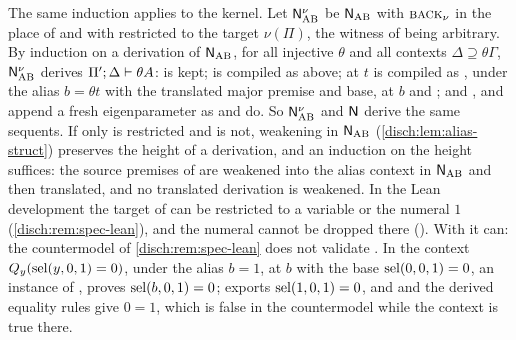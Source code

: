 \begin{remark}
\label{disch:rem:alias-kernel-newest}
The same induction applies to the kernel. Let $\mathsf{N}^{\nu}_{\mathrm{AB}}$
be $\mathsf{N}_{\mathrm{AB}}$ with $\rulename{Back}_{\nu}$ in the place of
 and with  restricted to the target $\nu(\Pi)$,
the witness of  being arbitrary. By induction on a derivation
of $\mathsf{N}_{\mathrm{AB}}$, for all injective $\theta$ and all contexts
$\Delta\supseteq\theta\Gamma$, $\mathsf{N}^{\nu}_{\mathrm{AB}}$ derives
$\Pi';\Delta\vdash\theta A$:  is kept;  is
compiled as above;  at $t$ is compiled as ,
under the alias $b=\theta t$ with the translated major premise and base,
 at $b$ and ; and , 
and  append a fresh eigenparameter as  and
 do. So $\mathsf{N}^{\nu}_{\mathrm{AB}}$ and $\mathsf{N}$ derive the
same sequents. If only  is restricted and  is
not, weakening in $\mathsf{N}_{\mathrm{AB}}$ (\cref{disch:lem:alias-struct})
preserves the height of a derivation, and an induction on the height
suffices: the source premises of  are weakened into the alias
context in $\mathsf{N}_{\mathrm{AB}}$ and then translated, and no translated
derivation is weakened.
In the Lean development the target of  can be restricted to a
variable or the numeral $1$ (\cref{disch:rem:spec-lean}), and the numeral
cannot be dropped there (). With
 it can: the countermodel of
\cref{disch:rem:spec-lean} does not validate . In the
context $Q_{y}(\operatorname{sel}(y,0,1)=0)$, under the alias $b=1$,  at $b$
with the base $\operatorname{sel}(0,0,1)=0$, an instance of , proves
$\operatorname{sel}(b,0,1)=0$;  exports $\operatorname{sel}(1,0,1)=0$, and
 and the derived equality rules give $0=1$, which is false in
the countermodel while the context is true there.
\end{remark}

